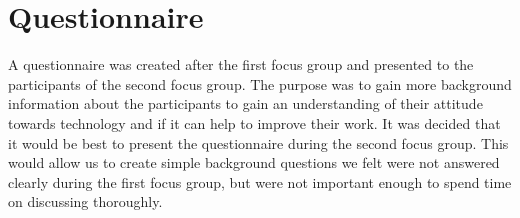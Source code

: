 \section{Questionnaire}
A questionnaire was created after the first focus group and presented to the participants of the second focus group. The purpose was to gain more background information about the participants to gain an understanding of their attitude towards technology and if it can help to improve their work. It was decided that it would be best to present the questionnaire during the second focus group. This would allow us to create simple background questions we felt were not answered clearly during the first focus group, but were not important enough to spend time on discussing thoroughly.
